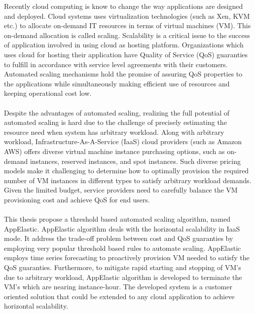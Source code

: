 
Recently cloud computing is know to change the way applications are designed and deployed. Cloud systems uses virtualization technologies (such as Xen, KVM etc.) to allocate on-demand IT resources in terms of virtual machines (VM). This on-demand allocation is called scaling. Scalability is a critical issue to the success of application involved in using cloud as hosting platform. Organizations which uses cloud for hosting their application have Quality of Service (QoS) guaranties to fulfill in accordance with service level agreements with their customers. Automated scaling mechanisms hold the promise of assuring QoS properties to the applications while simultaneously making efficient use of resources and keeping operational cost low.
\\
\\
Despite the advantages of automated scaling, realizing the full potential of automated scaling is hard due to the challenge of precisely estimating the resource need when system has arbitrary workload. Along with arbitrary workload, Infrastructure-As-A-Service (IaaS) cloud providers (such as Amazon AWS) offers diverse virtual machine instance purchasing options, such as on-demand instances, reserved instances, and spot instances. Such diverse pricing models make it challenging to determine how to optimally provision the required number of VM instances in different types to satisfy arbitrary workload demands. Given the limited budget, service providers need to carefully balance the VM provisioning cost and achieve QoS for end users.
\\
\\
This thesis propose a threshold based automated scaling algorithm, named AppElastic. AppElastic algorithm deals with the horizontal scalability in IaaS mode. It address the trade-off problem between cost and QoS guaranties by employing very popular threshold based rules to automate scaling. AppElastic employs time series forecasting to proactively provision VM needed to satisfy the QoS guaranties. Furthermore, to mitigate rapid starting and stopping of VM's due to arbitrary workload, AppElastic algorithm is developed to terminate the VM's which are nearing instance-hour. The developed system is a customer oriented solution that could be extended to any cloud application to achieve horizontal scalability.

